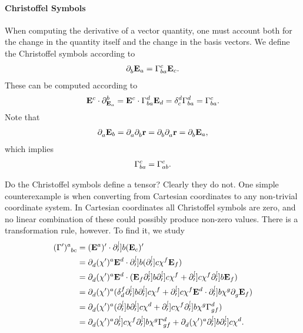\paragraph{Christoffel Symbols}
When computing the derivative of a vector quantity, one must account both for the change in the quantity itself and the change in the basis vectors. We define the Christoffel symbols according to
\begin{align*}
	\del{}{b}{\tb{a}} = \chris{c}{b}{a}\tb{c}.
\end{align*}
These can be computed according to
\begin{align*}
	\db{c}\cdot\del{b}{\tb{a}} = \db{c}\cdot\chris{d}{b}{a}\tb{d} = \kdelta{d}{c}\chris{d}{b}{a} = \chris{c}{b}{a}.
\end{align*}
Note that
\begin{align*}
	\partial^{}_{a}{\vb{E}_{b}} = \partial^{}_{a}{\partial^{}_{b}{\vb{r}}} = \partial^{}_{b}{\partial^{}_{a}{\vb{r}}} = \partial^{}_{b}{\vb{E}_{a}},
\end{align*}
which implies
\begin{align*}
	\chris{c}{b}{a} = \chris{c}{a}{b}.
\end{align*}

Do the Christoffel symbols define a tensor? Clearly they do not. One simple counterexample is when converting from Cartesian coordinates to any non-trivial coordinate system. In Cartesian coordinates all Christoffel symbols are zero, and no linear combination of these could possibly produce non-zero values. There is a transformation rule, however. To find it, we study
\begin{align*}
	\tensor{(\Gamma^{\prime})}{^{a}_{bc}} &= (\db{a})^{\prime}\cdot\del[\prime]{b}{(\tb{c})^{\prime}} \\
	                                      &= \del{}{d}{(\chi')^{a}}\db{d}\cdot\del[\prime]{b}{(\del[\prime]{c}{\chi^{f}}\tb{f})} \\
	                                      &= \del{}{d}{(\chi')^{a}}\db{d}\cdot(\tb{f}\del[\prime]{b}{\del[\prime]{c}{\chi^{f}}} + \del[\prime]{c}{\chi^{f}}\del[\prime]{b}{\tb{f}}) \\
	                                      &= \del{}{d}{(\chi')^{a}}(\kdelta{f}{d}\del[\prime]{b}{\del[\prime]{c}{\chi^{f}}} + \del[\prime]{c}{\chi^{f}}\db{d}\cdot\del[\prime]{b}{\chi^{g}}\del{}{g}{\tb{f}}) \\
	                                      &= \del{}{d}{(\chi')^{a}}(\del[\prime]{b}{\del[\prime]{c}{\chi^{d}}} + \del[\prime]{c}{\chi^{f}}\del[\prime]{b}{\chi^{g}}\chris{d}{g}{f}) \\
	                                      &= \del{}{d}{(\chi')^{a}}\del[\prime]{c}{\chi^{f}}\del[\prime]{b}{\chi^{g}}\chris{d}{g}{f} + \del{}{d}{(\chi')^{a}}\del[\prime]{b}{\del[\prime]{c}{\chi^{d}}}.
\end{align*}


